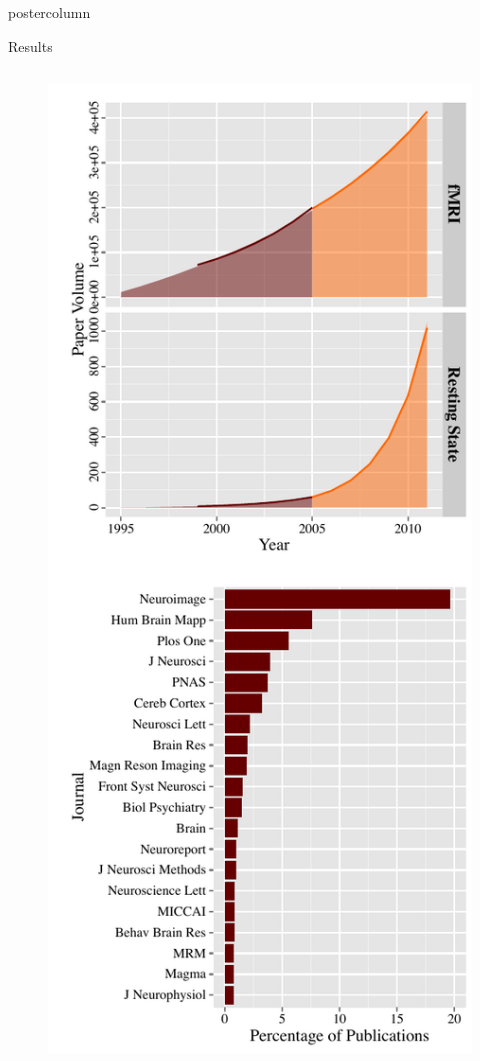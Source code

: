 \documentclass[final,hyperref={pdfpagelabels=false}]{beamer}
\begin{document}
\begin{frame}
\begin{columns}
\begin{column}{.5\textwidth}
\begin{beamercolorbox}[center,wd=\textwidth]{postercolumn}
\begin{minipage}[T]{.96\textwidth}
{\begin{block}{Results}
\begin{center}
\begin{columns}
\begin{column}{.45\linewidth}
\begin{figure}
                      \begin{center}
                          \includegraphics[width=.99\linewidth]{growth_rate.pdf}

\end{center}
\end{figure}
\end{column}
\end{columns}
\end{center}
\end{block}}
\end{minipage}
\end{beamercolorbox}
\end{column}
\end{columns}
\end{frame}
\end{document}
